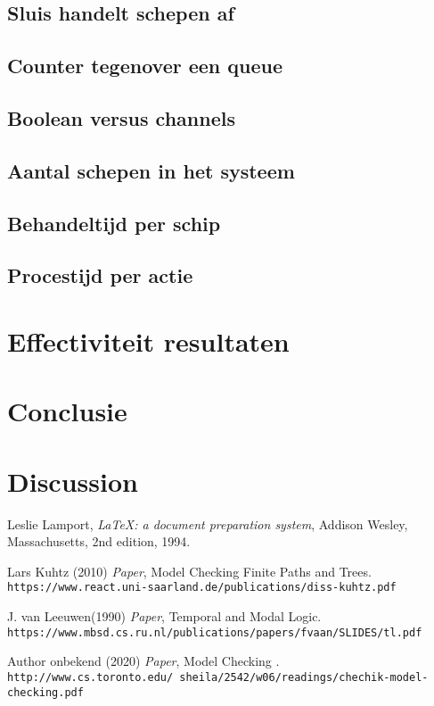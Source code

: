 \documentclass{article}
\begin{document}
\subsection{Sluis handelt schepen af}
\subsection{Counter tegenover een queue}
\subsection{Boolean versus channels}
\subsection{Aantal schepen in het systeem}
\subsection{Behandeltijd per schip}
\subsection{Procestijd per actie}
\newpage
\section{Effectiviteit resultaten}

\newpage
\section{Conclusie}

\newpage
\section{Discussion}

\newpage




\newpage
\begin{thebibliography}{9}

  Leslie Lamport,
  \textit{\LaTeX: a document preparation system},
  Addison Wesley, Massachusetts,
  2nd edition,
  1994.
  
Lars Kuhtz (2010)  \emph{Paper}, Model Checking Finite Paths and Trees.
\\\texttt{https://www.react.uni-saarland.de/publications/diss-kuhtz.pdf}

J. van Leeuwen(1990)  \emph{Paper}, Temporal and Modal Logic.
\\\texttt{https://www.mbsd.cs.ru.nl/publications/papers/fvaan/SLIDES/tl.pdf}

Author onbekend (2020)  \emph{Paper}, Model Checking .
\\\texttt{http://www.cs.toronto.edu/~sheila/2542/w06/readings/chechik-model-checking.pdf}


\end{thebibliography}
\end{document}
